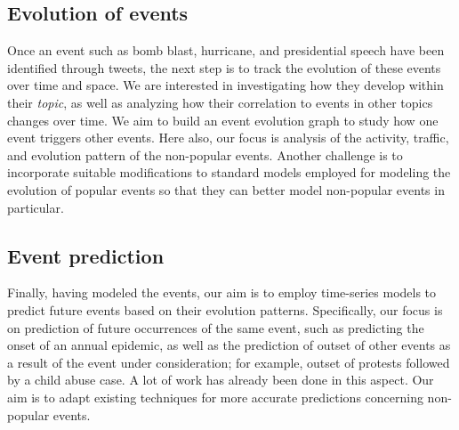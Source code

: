 \subsection{Evolution of events}
Once an event such as bomb blast, hurricane, and presidential speech have been identified through tweets, the next step is to track the evolution of these events over time and space. We are interested in investigating how they develop within their \emph{topic}, as well as analyzing how their correlation to events in other topics changes over time. We aim to build an event evolution graph to study how one event triggers other events. Here also, our focus is analysis  of the activity, traffic, and evolution pattern of the non-popular events. Another challenge is to incorporate suitable modifications to standard models employed for modeling the evolution of popular events \cite{lin2010pet} so that they can better model non-popular events in particular.

\subsection{Event prediction}
Finally, having modeled the events, our aim is to employ time-series models to predict future events based on their evolution patterns. Specifically, our focus is on prediction of future occurrences of the same event, such as predicting the onset of an annual epidemic, as well as the prediction of outset of other events as a result of the event under consideration; for example, outset of protests followed by a child abuse case. A lot of work has already been done in this aspect. Our aim is to adapt existing techniques for more accurate predictions concerning non-popular events.